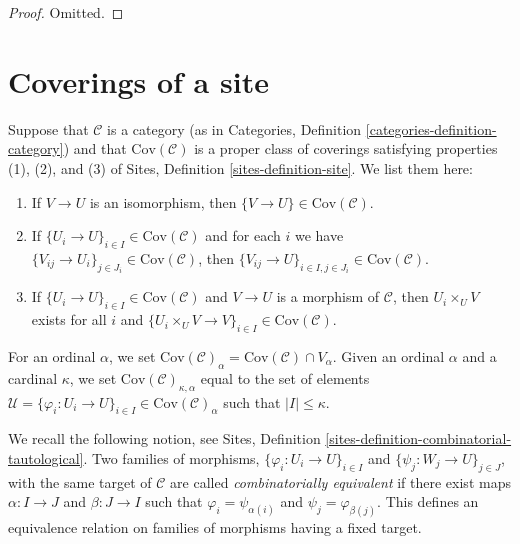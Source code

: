 \begin{proof}
Omitted.
\end{proof}

\section{Coverings of a site}
\label{sets-section-coverings-site}
Suppose that $\mathcal{C}$ is a category (as in
Categories, Definition \ref{categories-definition-category}) and
that $\text{Cov}(\mathcal{C})$ is a proper class of coverings
satisfying properties (1), (2), and (3) of Sites,
Definition \ref{sites-definition-site}. We list them here:
\begin{enumerate}
\item If $V \to U$ is an isomorphism, then $\{V \to U\} \in
\text{Cov}(\mathcal{C})$.
\item If $\{U_i \to U\}_{i\in I} \in \text{Cov}(\mathcal{C})$ and for each
$i$ we have $\{V_{ij} \to U_i\}_{j\in J_i} \in \text{Cov}(\mathcal{C})$, then
$\{V_{ij} \to U\}_{i \in I, j\in J_i} \in \text{Cov}(\mathcal{C})$.
\item If $\{U_i \to U\}_{i\in I}\in \text{Cov}(\mathcal{C})$
and $V \to U$ is a morphism of $\mathcal{C}$, then $U_i \times_U V$
exists for all $i$ and
$\{U_i \times_U V \to V \}_{i\in I} \in \text{Cov}(\mathcal{C})$.
\end{enumerate}
For an ordinal $\alpha$, we set
$\text{Cov}(\mathcal{C})_\alpha = \text{Cov}(\mathcal{C}) \cap V_\alpha$.
Given an ordinal $\alpha$ and a cardinal $\kappa$, we set
$\text{Cov}(\mathcal{C})_{\kappa, \alpha}$ equal to the set
of elements
$\mathcal{U} =
\{\varphi_i : U_i \to U\}_{i\in I} \in \text{Cov}(\mathcal{C})_\alpha$
such that $|I| \leq \kappa$.

\medskip\noindent
We recall the following notion, see Sites, Definition
\ref{sites-definition-combinatorial-tautological}.
Two families of morphisms, $\{\varphi_i : U_i \to U\}_{i\in I}$ and
$\{\psi_j : W_j \to U\}_{j\in J}$, with the same target of $\mathcal{C}$ are
called {\it combinatorially equivalent} if there exist maps
$\alpha : I \to J$ and $\beta : J\to I$ such that
$\varphi_i = \psi_{\alpha(i)}$ and $\psi_j = \varphi_{\beta(j)}$.
This defines an equivalence relation on families of morphisms
having a fixed target.

